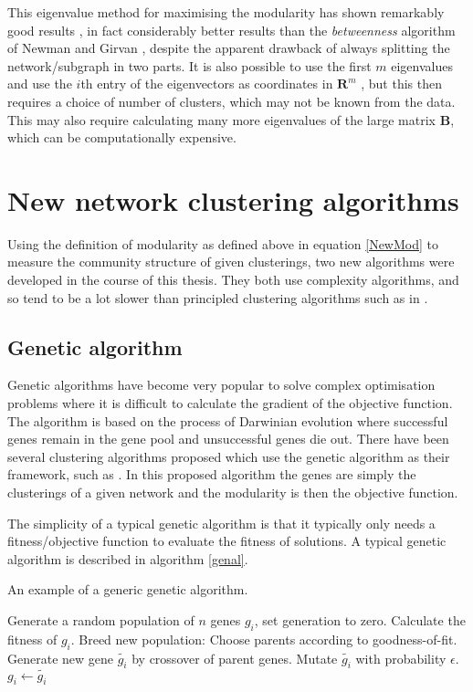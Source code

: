 This eigenvalue method for maximising the modularity has shown
remarkably good results \cite{Newman2006a}, in fact considerably better results
than the {\sl betweenness} algorithm of Newman and Girvan 
\cite{NewmanGirvan2004a}, despite the apparent drawback of always splitting the 
network/subgraph in two parts. It is also possible to use the first $m$ 
eigenvalues and use the $i$th entry of the eigenvectors as coordinates in 
$\mathbf{R}^{m}$ \cite{Humphries2011a}, but this then requires a choice of 
number of clusters, which may not be known from the data.  This may also 
require calculating many more eigenvalues of the large matrix $\mathbf{B}$, 
which can be computationally expensive.

\section{New network clustering algorithms}
Using the definition of modularity as defined above in equation \ref{NewMod} to measure the community structure of given clusterings, two new algorithms were developed in the course of this thesis.  They both use complexity algorithms, and so tend to be a lot slower than principled clustering algorithms such as in \cite{Newman2006a} \cite{NewmanGirvan2004a}.

\subsection{Genetic algorithm}
Genetic algorithms have become very popular to solve complex optimisation problems where it is difficult to calculate the gradient of the objective function.  The algorithm is based on the process of Darwinian evolution where successful genes remain in the gene pool and unsuccessful genes die out.  There have been several clustering algorithms proposed which use the genetic algorithm as their framework, such as \cite{Pizzuti2008a}. In this proposed algorithm the genes are simply the clusterings of a given network and the modularity is then the objective function.

The simplicity of a typical genetic algorithm is that it typically only needs a fitness/objective function to evaluate the fitness of solutions.  A typical genetic algorithm is described in algorithm \ref{genal}.

\begin{algorithm}
\caption{An example of a generic genetic algorithm.}
\label{genal}
\begin{algorithmic}
\STATE Generate a random population of $n$ genes $g_i$, set generation to zero.
\STATE Calculate the fitness of $g_i$.
\ENDFOR
\STATE Breed new population:
\STATE Choose parents according to goodness-of-fit.
\STATE Generate new gene $\tilde{g_i}$ by crossover of parent genes.
\STATE Mutate $\tilde{g_i}$ with probability $\epsilon$.
\ENDFOR
{} \STATE $g_i \leftarrow \tilde{g_i}$ \ENDFOR
\ENDWHILE
\end{algorithmic}
\end{algorithm}

